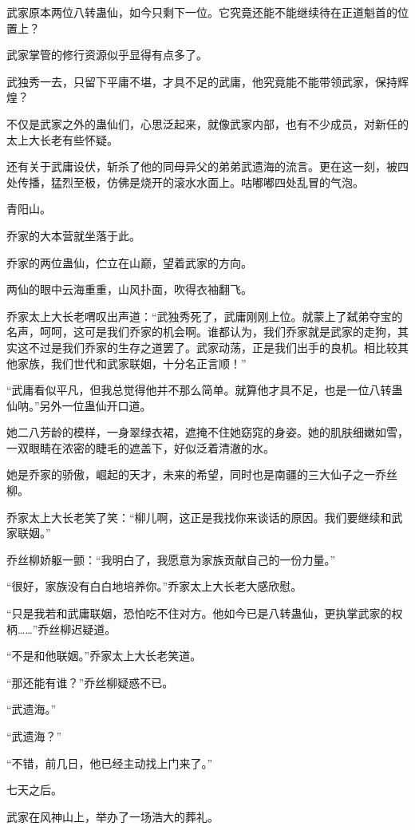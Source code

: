 \begin{this_body}
武家原本两位八转蛊仙，如今只剩下一位。它究竟还能不能继续待在正道魁首的位置上？

武家掌管的修行资源似乎显得有点多了。

武独秀一去，只留下平庸不堪，才具不足的武庸，他究竟能不能带领武家，保持辉煌？

不仅是武家之外的蛊仙们，心思泛起来，就像武家内部，也有不少成员，对新任的太上大长老有些怀疑。

还有关于武庸设伏，斩杀了他的同母异父的弟弟武遗海的流言。更在这一刻，被四处传播，猛烈至极，仿佛是烧开的滚水水面上。咕嘟嘟四处乱冒的气泡。

青阳山。

乔家的大本营就坐落于此。

乔家的两位蛊仙，伫立在山巅，望着武家的方向。

两仙的眼中云海重重，山风扑面，吹得衣袖翻飞。

乔家太上大长老喟叹出声道：“武独秀死了，武庸刚刚上位。就蒙上了弑弟夺宝的名声，呵呵，这可是我们乔家的机会啊。谁都认为，我们乔家就是武家的走狗，其实这不过是我们乔家的生存之道罢了。武家动荡，正是我们出手的良机。相比较其他家族，我们世代和武家联姻，十分名正言顺！”

“武庸看似平凡，但我总觉得他并不那么简单。就算他才具不足，也是一位八转蛊仙呐。”另外一位蛊仙开口道。

她二八芳龄的模样，一身翠绿衣裙，遮掩不住她窈窕的身姿。她的肌肤细嫩如雪，一双眼睛在浓密的睫毛的遮盖下，好似泛着清澈的水。

她是乔家的骄傲，崛起的天才，未来的希望，同时也是南疆的三大仙子之一乔丝柳。

乔家太上大长老笑了笑：“柳儿啊，这正是我找你来谈话的原因。我们要继续和武家联姻。”

乔丝柳娇躯一颤：“我明白了，我愿意为家族贡献自己的一份力量。”

“很好，家族没有白白地培养你。”乔家太上大长老大感欣慰。

“只是我若和武庸联姻，恐怕吃不住对方。他如今已是八转蛊仙，更执掌武家的权柄……”乔丝柳迟疑道。

“不是和他联姻。”乔家太上大长老笑道。

“那还能有谁？”乔丝柳疑惑不已。

“武遗海。”

“武遗海？”

“不错，前几日，他已经主动找上门来了。”

七天之后。

武家在风神山上，举办了一场浩大的葬礼。


\end{this_body}
